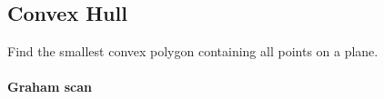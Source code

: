 \subsection{Convex Hull}
Find the smallest convex polygon containing all points on a plane.
\paragraph{Graham scan}
